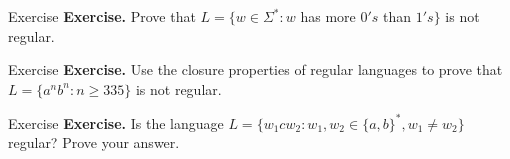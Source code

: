 \documentclass[10pt]{beamer}
\begin{document}
\begin{frame}[t]{Exercise}
    \textbf{Exercise.} Prove that $L=\{w\in \Sigma ^*: w$ has more $0's$ than $1's \}$ is not regular.
\end{frame}

\begin{frame}[t]{Exercise}
    \textbf{Exercise.} Use the closure properties of regular languages to prove that $L=\{{a^n}b^n: n\geq 335\}$ is not regular.
\end{frame}

\begin{frame}[t]{Exercise}
    \textbf{Exercise.} Is the language $L = \{w_1cw_2 : w_1,w_2 \in \{a,b\}^*, w_1 \neq w_2\}$ regular? Prove your answer.
\end{frame}
\end{document}
